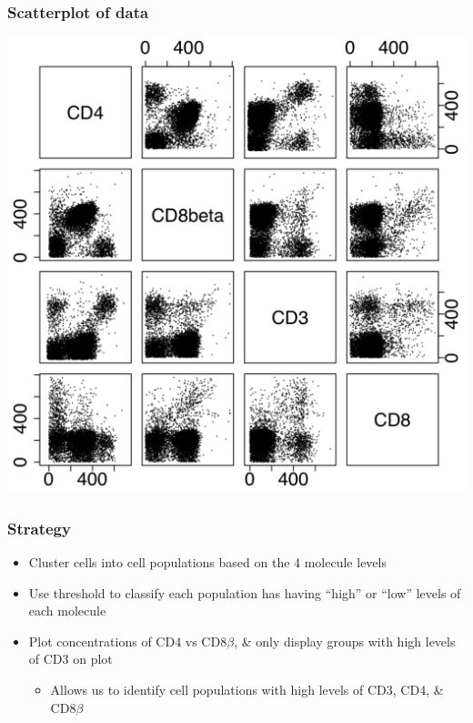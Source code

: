 \documentclass[mathserif,compress]{beamer}
\renewcommand\;{\,}
\begin{document}
\begin{frame}\frametitle{Scatterplot of data}
\begin{center}
\includegraphics[width=0.7\linewidth]{scatter.png}
\end{center}
\end{frame}

\begin{frame}\frametitle{Strategy}
\begin{itemize}
\item
\alert{Cluster cells into cell populations} based on the 4 molecule levels
\bigskip
\item
Use \alert{threshold} to classify each population has having ``high'' or ``low'' levels of each molecule
\bigskip
\item
Plot concentrations of CD4 vs CD8$\beta$, \& \alert{only display groups with high levels of CD3} on plot
\begin{itemize}
\bigskip
\item
Allows us to identify cell populations with high levels of CD3, CD4, \& CD8$\beta$
\end{itemize}
\end{itemize}
\end{frame}
\end{document}
